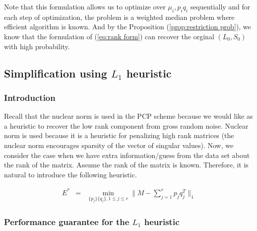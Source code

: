 Note that this formulation allows us to optimize over $\mu_{i},p_{i}q_{i}$
sequentially and for each step of optimization, the problem is a weighted
median problem where efficient algorithm is known. And by the Proposition
(\ref{prop:restriction prob}), we know that the formulation of (\ref{eq:rank form})
can recover the orginal $(L_{0},S_{0})$ with high probability.


\subsection{Simplification using $L_{1}$ heuristic}


\subsubsection{Introduction}

Recall that the nuclear norm is used in the PCP scheme because we would like as a heuristic to recover the low rank component from gross random noise. Nuclear norm is used because it is a heuristic for penalizing high rank matrices (the nuclear norm encourages sparsity of the vector of singular values). Now, we consider the case when we have extra information/guess from the data set about the rank of the matrix. Assume the rank of the matrix is known. Therefore, it is natural to introduce the following heuristic.

\begin{eqnarray}
E^{*} & = & \min_{\{p_{j}\}\{q_{j}\},1\le j\le r}\|M-\sum_{j=1}^{r}p_{j}q_{j}^{T}\|_{1}\label{heu}
\end{eqnarray}



\subsubsection{Performance guarantee for the $L_1$ heuristic}

